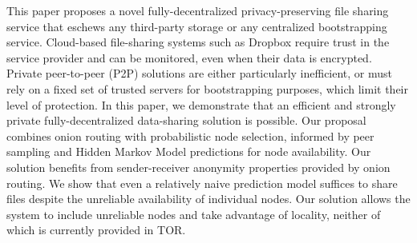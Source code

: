 %
This paper proposes a novel fully-decentralized privacy-preserving file sharing service that eschews any third-party storage or any centralized bootstrapping service.
Cloud-based file-sharing systems such as Dropbox require trust in the service provider and can be monitored, even when their data is encrypted. Private peer-to-peer (P2P) solutions are either particularly inefficient, or must rely on a fixed set of trusted servers for bootstrapping purposes, which limit their level of protection. %
In this paper, we demonstrate that an efficient and strongly private fully-decentralized data-sharing solution is possible. Our proposal combines onion routing with probabilistic node selection, informed by peer sampling and Hidden Markov Model predictions for node availability.
Our solution benefits from sender-receiver anonymity properties provided by onion routing. %
We show that even a relatively naive prediction model suffices to share files despite the unreliable availability of individual nodes. %
Our solution allows the system to include unreliable nodes and take advantage of locality, neither of which is currently provided in TOR.

